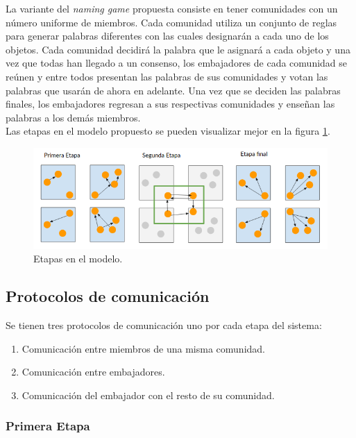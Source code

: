 \documentclass[runningheads]{llncs}
\begin{document}
La variante del \textit{naming game} propuesta consiste en tener comunidades con un número uniforme de miembros. Cada comunidad utiliza un conjunto de reglas para generar palabras diferentes con las cuales designarán a cada uno de los objetos. Cada comunidad decidirá la palabra que le asignará a cada objeto y una vez que todas han llegado a un consenso, los embajadores de cada comunidad se reúnen y entre todos presentan las palabras de sus comunidades y votan las palabras que usarán de ahora en adelante. Una vez que se deciden las palabras finales, los embajadores regresan a sus respectivas comunidades y enseñan las palabras a los demás miembros.\\
Las etapas en el modelo propuesto se pueden visualizar mejor en la figura \ref{fig0}.
\begin{figure}
	\includegraphics[width=\textwidth]{modelo1.png}
	\caption{Etapas en el modelo.}
	\label{fig0}
\end{figure}

\subsection{Protocolos de comunicación}

Se tienen tres protocolos de comunicación uno por cada etapa del sistema:
\begin{enumerate}
	\item Comunicación entre miembros de una misma comunidad.
	\item Comunicación entre embajadores.
	\item Comunicación del embajador con el resto de su comunidad.
\end{enumerate}
\subsubsection{Primera Etapa}
\end{document}
